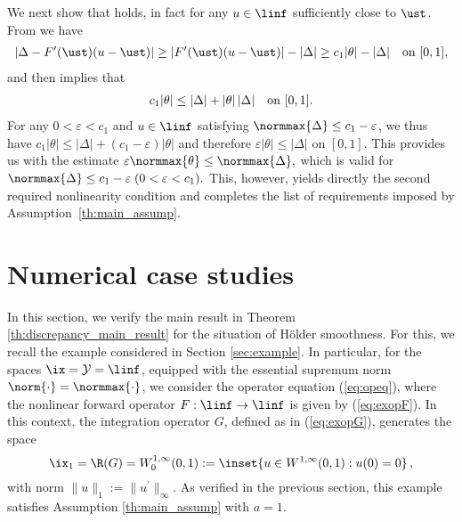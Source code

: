 \documentclass[10pt]{article}
\theoremstyle{definition}
\begin{document}
\begin{myenumerate}
\item
We next show that  holds, in fact for any $ u \in \linf $  sufficiently close to $ \ust $.
From  we have
%
\begin{align*}
\vert \Delta-  F^\prime(\ust) (u-\ust) \vert
\ge
\vert F^\prime(\ust) (u-\ust) \vert - \vert \Delta \vert
\ge
c_1 \vert \theta \vert - \vert \Delta \vert \quad \textup{on } [0,1],
\end{align*}
%
%
and  then implies that
%
\begin{align*}
c_1 \vert \theta \vert \le \vert \Delta \vert
+ \vert \theta \vert \, \vert \Delta \vert
\quad \textup{on } [0,1].
\end{align*}
%
For any $ 0 < \varepsilon < c_1 $ and $ u \in \linf $ satisfying $ \normmax{\Delta} \le c_1 - \varepsilon $, we thus have
%
$ c_1\vert \theta \vert \le \vert \Delta \vert + (c_1-\varepsilon) \vert \theta \vert
$
and therefore $ \varepsilon \vert \theta \vert \le \vert \Delta \vert $
on $ [0,1] $.
This provides us with the estimate $ \varepsilon \normmax{\theta} \le \normmax{\Delta},$ which is valid for
$\normmax{\Delta} \le c_1-\varepsilon \; (0 < \varepsilon < c_1).$
%
This, however, yields directly the second required nonlinearity condition  and completes the list of requirements imposed by Assumption~\ref{th:main_assump}.
%
\end{myenumerate}
%
\section{Numerical case studies} \label{sec:study}
In this section, we verify the main result in Theorem \ref{th:discrepancy_main_result} for the situation of H\"older smoothness.
For this, we recall the example considered in Section \ref{sec:example}.
In particular, for the spaces $\ix =\mathcal{Y}=\linf$, equipped with the essential supremum norm $ \norm{\cdot} = \normmax{\cdot} $, we consider the operator equation (\ref{eq:opeq}), where the nonlinear forward operator $ F: \linf \to \linf $ is given by (\ref{eq:exopF}).
In this context, the integration operator $G$, defined as in (\ref{eq:exopG}),
generates the space
$$\ix_{1}=\R(G)=W^{1,\infty}_0(0,1) :=  \inset{ u \in W^{1,\infty}(0,1) : u(0) = 0 }\,,$$
with norm $\|u\|_1:=\|u^\prime\|_\infty$.
As verified in the previous section, this example satisfies Assumption \ref{th:main_assump} with $a=1$.
\end{document}

